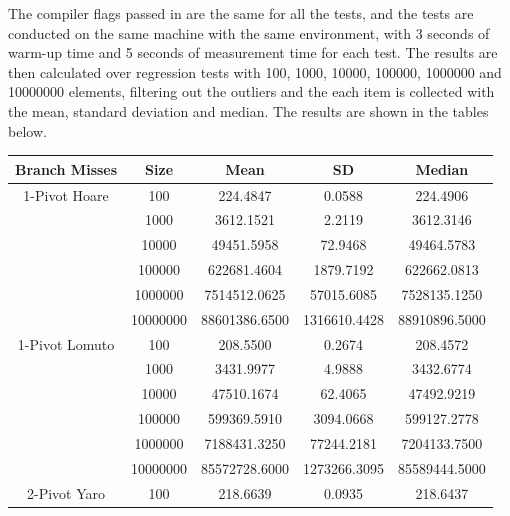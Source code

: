 \documentclass{article}
\begin{document}
The compiler flags passed in are the same for all the tests, and the tests are conducted on the same machine with the same environment,
with 3 seconds of warm-up time and 5 seconds of measurement time for each test. The results are then calculated over regression tests with 100, 1000, 10000, 100000, 1000000 and 10000000 elements,
filtering out the outliers and the each item is collected with the mean, standard deviation and median. The results are shown in the tables below.
\begin{center}
    \small
    \begin{tabular}{ |c c | c c c| }
        \hline
        Branch Misses   & Size     & Mean           & SD            & Median \\
        \hline
        1-Pivot Hoare   & 100      & 224.4847       & 0.0588        & 224.4906 \\
                        & 1000     & 3612.1521      & 2.2119        & 3612.3146 \\
                        & 10000    & 49451.5958     & 72.9468       & 49464.5783 \\
                        & 100000   & 622681.4604    & 1879.7192     & 622662.0813 \\
                        & 1000000  & 7514512.0625   & 57015.6085    & 7528135.1250 \\
                        & 10000000 & 88601386.6500  & 1316610.4428  & 88910896.5000 \\
        \hline
        1-Pivot Lomuto  & 100      & 208.5500       & 0.2674        & 208.4572 \\
                        & 1000     & 3431.9977      & 4.9888        & 3432.6774 \\
                        & 10000    & 47510.1674     & 62.4065       & 47492.9219 \\
                        & 100000   & 599369.5910    & 3094.0668     & 599127.2778 \\
                        & 1000000  & 7188431.3250   & 77244.2181    & 7204133.7500 \\
                        & 10000000 & 85572728.6000  & 1273266.3095  & 85589444.5000 \\
        \hline
        2-Pivot Yaro    & 100      & 218.6639       & 0.0935        & 218.6437 \\

\end{tabular}
\end{center}
\end{document}
